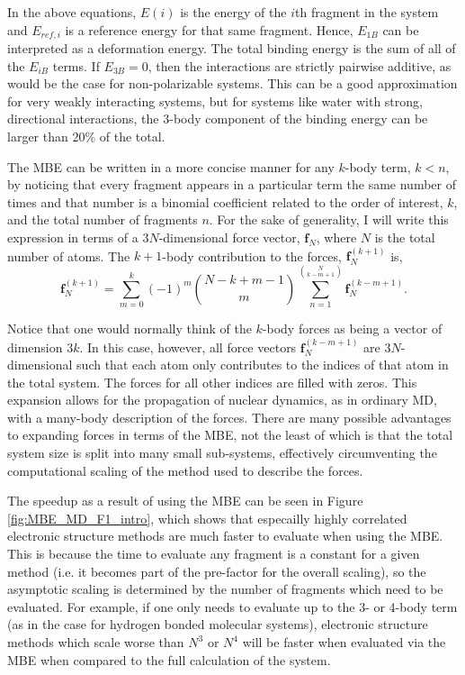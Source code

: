 \documentclass[11pt, proquest]{uwthesis}[2020/02/24]
\begin{document}
In the above equations, $E(i)$ is the energy of the $i$th fragment in the system and $E_{ref,i}$ is a reference energy for that same fragment. Hence, $E_{1B}$ can be interpreted as a deformation energy. The total binding energy is the sum of all of the $E_{iB}$ terms. If $E_{3B}=0$, then the interactions are strictly pairwise additive, as would be the case for non-polarizable systems. This can be a good approximation for very weakly interacting systems, but for systems like water with strong, directional interactions, the 3-body component of the binding energy can be larger than 20\% of the total.\autocite{xantheas_ab_1994}

\par The MBE can be written in a more concise manner for any $k$-body term, $k<n$, by noticing that every fragment appears in a particular term the same number of times and that number is a binomial coefficient related to the order of interest, $k$, and the total number of fragments $n$. For the sake of generality, I will write this expression in terms of a 3$N$-dimensional force vector, $\mathbf{f}_N$, where $N$ is the total number of atoms. The $k+1$-body contribution to the forces, $\mathbf{f}_N^{(k+1)}$ is,
\begin{equation}
    \mathbf{f}_N^{(k+1)}=\sum_{m=0}^k(-1)^{m}\binom{N-k+m-1}{m}\sum_{n=1}^{\binom{N}{k-m+1}}\mathbf{f}_N^{(k-m+1)}.
\end{equation}

Notice that one would normally think of the $k$-body forces as being a vector of dimension $3k$. In this case, however, all force vectors $\mathbf{f}_N^{(k-m+1)}$ are $3N$-dimensional such that each atom only contributes to the indices of that atom in the total system. The forces for all other indices are filled with zeros. This expansion allows for the propagation of nuclear dynamics, as in ordinary MD, with a many-body description of the forces. There are many possible advantages to expanding forces in terms of the MBE, not the least of which is that the total system size is split into many small sub-systems, effectively circumventing the computational scaling of the method used to describe the forces.



\par The speedup as a result of using the MBE can be seen in Figure \ref{fig:MBE_MD_F1_intro}, which shows that especailly highly correlated electronic structure methods are much faster to evaluate when using the MBE. This is because the time to evaluate any fragment is a constant for a given method (i.e. it becomes part of the pre-factor for the overall scaling), so the asymptotic scaling is determined by the number of fragments which need to be evaluated. For example, if one only needs to evaluate up to the 3- or 4-body term (as in the case for hydrogen bonded molecular systems), electronic structure methods which scale worse than $N^3$ or $N^4$ will be faster when evaluated via the MBE when compared to the full calculation of the system.
\end{document}
